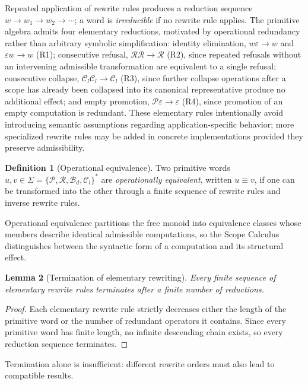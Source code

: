 \documentclass[11pt,twoside,openright]{book}
\numberwithin{equation}{chapter}
\theoremstyle{definition}
\newtheorem{definition}{Definition}[chapter]
\theoremstyle{plain}
\newtheorem{lemma}[definition]{Lemma}
\theoremstyle{remark}
\theoremstyle{definition}
\newcommand{\Alphabet}{\Sigma}
\newcommand{\Pop}{\mathcal{P}}
\newcommand{\Refuse}{\mathcal{R}}
\newcommand{\Bind}{\mathcal{B}_d}
\newcommand{\Collapse}{\mathcal{C}_l}
\newcommand{\ScopeAlphabet}{\Alphabet=\{\Pop,\Refuse,\Bind,\Collapse\}}
\begin{document}
Repeated application of rewrite rules produces a reduction sequence
$w\longrightarrow w_1\longrightarrow w_2\longrightarrow\cdots$; a word is
\emph{irreducible} if no rewrite rule applies. The primitive algebra
admits four elementary reductions, motivated by operational redundancy
rather than arbitrary symbolic simplification: identity elimination,
$w\varepsilon\longrightarrow w$ and $\varepsilon w\longrightarrow w$ (R1);
consecutive refusal, $\Refuse\Refuse\longrightarrow\Refuse$ (R2), since
repeated refusals without an intervening admissible transformation are
equivalent to a single refusal; consecutive collapse,
$\Collapse\Collapse\longrightarrow\Collapse$ (R3), since further collapse
operations after a scope has already been collapsed into its canonical
representative produce no additional effect; and empty promotion,
$\Pop\varepsilon\longrightarrow\varepsilon$ (R4), since promotion of an
empty computation is redundant. These elementary rules intentionally
avoid introducing semantic assumptions regarding application-specific
behavior; more specialized rewrite rules may be added in concrete
implementations provided they preserve admissibility.

\begin{definition}[Operational equivalence]
Two primitive words $u,v\in\ScopeAlphabet^{*}$ are \emph{operationally
equivalent}, written $u\equiv v$, if one can be transformed into the other
through a finite sequence of rewrite rules and inverse rewrite rules.
\end{definition}

Operational equivalence partitions the free monoid into equivalence
classes whose members describe identical admissible computations, so the
Scope Calculus distinguishes between the syntactic form of a computation
and its structural effect.

\begin{lemma}[Termination of elementary rewriting]
Every finite sequence of elementary rewrite rules terminates after a
finite number of reductions.
\end{lemma}

\begin{proof}
Each elementary rewrite rule strictly decreases either the length of the
primitive word or the number of redundant operators it contains. Since
every primitive word has finite length, no infinite descending chain
exists, so every reduction sequence terminates.
\end{proof}

Termination alone is insufficient: different rewrite orders must also
lead to compatible results.
\end{document}
